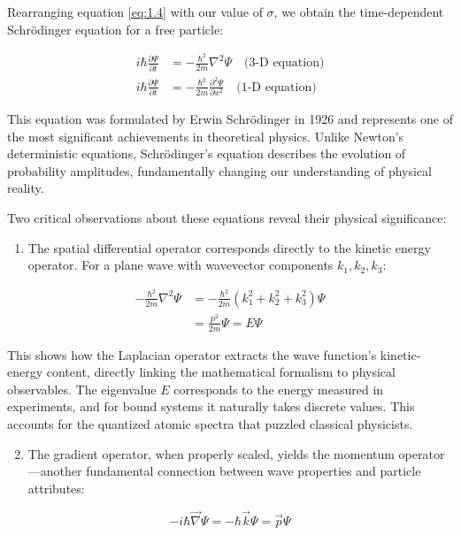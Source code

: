 Rearranging equation \eqref{eq:1.4} with our value of $\sigma$, we obtain the time-dependent Schrödinger equation for a free particle:

\begin{align}
i \hbar \frac{\partial \Psi}{\partial t} & =-\frac{\hbar^{2}}{2 m} \nabla^{2} \Psi \quad \text{(3-D equation)} \\
i \hbar \frac{\partial \Psi}{\partial t} & =-\frac{\hbar^{2}}{2 m} \frac{\partial^{2} \Psi}{\partial x^{2}} \quad \text{(1-D equation)}
\end{align}

This equation was formulated by Erwin Schrödinger in 1926 and represents one of the most significant achievements in theoretical physics. Unlike Newton's deterministic equations, Schrödinger's equation describes the evolution of probability amplitudes, fundamentally changing our understanding of physical reality.

Two critical observations about these equations reveal their physical significance:

\begin{enumerate}
  \item The spatial differential operator corresponds directly to the kinetic energy operator. For a plane wave with wavevector components $k_1, k_2, k_3$:
\end{enumerate}

\begin{align}
-\frac{\hbar^{2}}{2 m} \nabla^{2} \Psi & =-\frac{\hbar^{2}}{2 m}\left(k_{1}^{2}+k_{2}^{2}+k_{3}^{2}\right) \Psi  \\
& =\frac{p^{2}}{2 m} \Psi=E \Psi
\end{align}

This shows how the Laplacian operator extracts the wave function’s kinetic-energy content, directly linking the mathematical formalism to physical observables. The eigenvalue
$E$ corresponds to the energy measured in experiments, and for bound systems it naturally takes discrete values. This accounts for the quantized atomic spectra that puzzled classical physicists.

\begin{enumerate}
  \setcounter{enumi}{1}
  \item The gradient operator, when properly scaled, yields the momentum operator—another fundamental connection between wave properties and particle attributes:
\end{enumerate}

\begin{equation}
-i \hbar \vec{\nabla} \Psi=-\hbar \vec{k} \Psi=\vec{p} \Psi
\end{equation}

